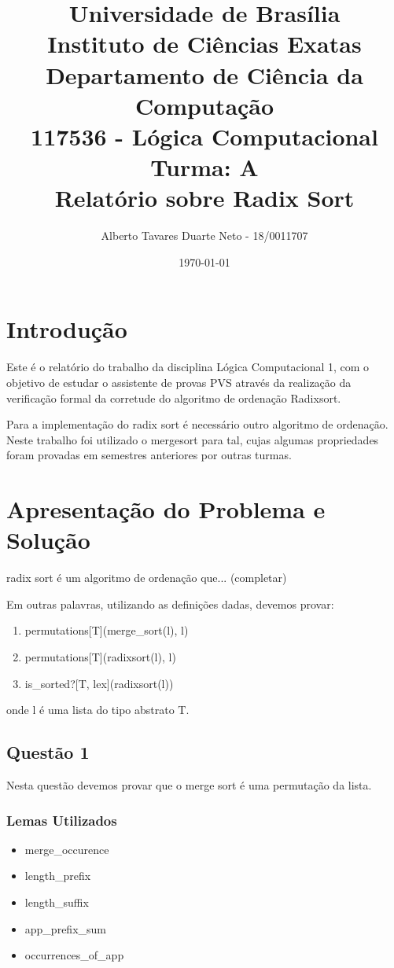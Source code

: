\documentclass[12pt]{article}
\title{{\large Universidade de Brasília \\ Instituto de Ciências Exatas \\
Departamento de Ciência da Computação} \\[1cm]
117536 - Lógica Computacional Turma: A\\[.5cm]
Relatório sobre {\bf Radix Sort}}
\author{Alberto Tavares Duarte Neto - 18/0011707}
\date{\today}
\begin{document}
\maketitle

\section{Introdução}

Este é o relatório do trabalho da disciplina Lógica Computacional 1, com o objetivo de estudar o assistente de provas PVS através da realização da verificação formal da corretude do algoritmo de ordenação Radixsort.

Para a implementação do radix sort é necessário outro algoritmo de ordenação. Neste trabalho foi utilizado o mergesort para tal, cujas algumas propriedades foram provadas em semestres anteriores por outras turmas.

\section{Apresentação do Problema e Solução}

radix sort é um algoritmo de ordenação que... (completar)

Em outras palavras, utilizando as definições dadas, devemos provar:

\begin{enumerate}
    \item permutations[T](merge\_sort(l), l)
    \item permutations[T](radixsort(l), l)
    \item is\_sorted?[T, lex](radixsort(l))
\end{enumerate}

onde l é uma lista do tipo abstrato T.

\subsection{Questão 1}

Nesta questão devemos provar que o merge sort é uma permutação da lista.

\subsubsection{Lemas Utilizados}

\begin{itemize}
    \item merge\_occurence
    \item length\_prefix
    \item length\_suffix
    \item app\_prefix\_sum
    \item occurrences\_of\_app
\end{itemize}
\end{document}
